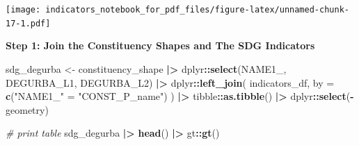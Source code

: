 \documentclass[
]{article}
\newenvironment{Shaded}{\begin{snugshade}}{\end{snugshade}}
\newcommand{\AttributeTok}[1]{\textcolor[rgb]{0.13,0.29,0.53}{#1}}
\newcommand{\CommentTok}[1]{\textcolor[rgb]{0.56,0.35,0.01}{\textit{#1}}}
\newcommand{\FunctionTok}[1]{\textcolor[rgb]{0.13,0.29,0.53}{\textbf{#1}}}
\newcommand{\NormalTok}[1]{#1}
\newcommand{\OtherTok}[1]{\textcolor[rgb]{0.56,0.35,0.01}{#1}}
\newcommand{\SpecialCharTok}[1]{\textcolor[rgb]{0.81,0.36,0.00}{\textbf{#1}}}
\newcommand{\StringTok}[1]{\textcolor[rgb]{0.31,0.60,0.02}{#1}}
\newenvironment{UNFPAShadedBox}{%
\begin{tcolorbox}[sharp corners, enhanced, colback=white, boxrule=0pt, borderline west={2pt}{0pt}{orange}]%
}{\end{tcolorbox}}
\newenvironment{Highlighting}{\begin{UNFPAShadedBox}}{\end{UNFPAShadedBox}}
\begin{document}
\texttt{[image: indicators\_notebook\_for\_pdf\_files/figure-latex/unnamed-chunk-17-1.pdf]}

\textbf{Step 1: Join the Constituency Shapes and The SDG Indicators}

\begin{Shaded}
\begin{Highlighting}[]
\NormalTok{sdg\_degurba }\OtherTok{\textless{}{-}} 
\NormalTok{  constituency\_shape }\SpecialCharTok{|\textgreater{}}
\NormalTok{  dplyr}\SpecialCharTok{::}\FunctionTok{select}\NormalTok{(NAME1\_, DEGURBA\_L1, DEGURBA\_L2) }\SpecialCharTok{|\textgreater{}}
\NormalTok{  dplyr}\SpecialCharTok{::}\FunctionTok{left\_join}\NormalTok{(}
\NormalTok{    indicators\_df,}
    \AttributeTok{by =} \FunctionTok{c}\NormalTok{(}\StringTok{"NAME1\_"} \OtherTok{=} \StringTok{"CONST\_P\_name"}\NormalTok{)}
\NormalTok{  ) }\SpecialCharTok{|\textgreater{}}
\NormalTok{  tibble}\SpecialCharTok{::}\FunctionTok{as.tibble}\NormalTok{() }\SpecialCharTok{|\textgreater{}}
\NormalTok{  dplyr}\SpecialCharTok{::}\FunctionTok{select}\NormalTok{(}\SpecialCharTok{{-}}\NormalTok{geometry)}

\CommentTok{\# print table}
\NormalTok{sdg\_degurba }\SpecialCharTok{|\textgreater{}}
  \FunctionTok{head}\NormalTok{() }\SpecialCharTok{|\textgreater{}}
\NormalTok{  gt}\SpecialCharTok{::}\FunctionTok{gt}\NormalTok{()}
\end{Highlighting}
\end{Shaded}
\end{document}
